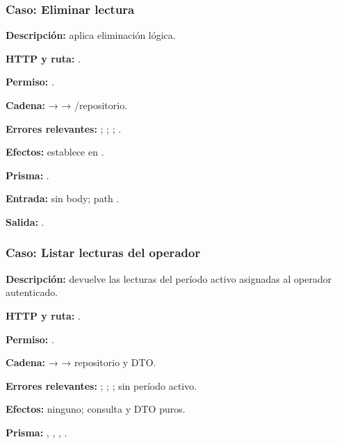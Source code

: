 \subsubsection{Caso: Eliminar lectura}


\textbf{Descripción:} aplica eliminación lógica.  

\textbf{HTTP y ruta:} \texttt{}.  

\textbf{Permiso:} \texttt{}.  

\textbf{Cadena:} \texttt{} → \texttt{} → \texttt{}/repositorio.  

\textbf{Errores relevantes:} \texttt{}; \texttt{}; \texttt{}; \texttt{}.  

\textbf{Efectos:} establece \texttt{} en \texttt{}.  

\textbf{Prisma:} \texttt{}.  

\textbf{Entrada:} sin body; path \texttt{}.  

\textbf{Salida:} \texttt{}.


\subsubsection{Caso: Listar lecturas del operador}


\textbf{Descripción:} devuelve las lecturas del período activo asignadas al operador autenticado.  

\textbf{HTTP y ruta:} \texttt{}.  

\textbf{Permiso:} \texttt{}.  

\textbf{Cadena:} \texttt{} → \texttt{} → repositorio y DTO.  

\textbf{Errores relevantes:} \texttt{}; \texttt{}; \texttt{}; \texttt{} sin período activo.  

\textbf{Efectos:} ninguno; consulta y DTO puros.  

\textbf{Prisma:} \texttt{}, \texttt{}, \texttt{}, \texttt{}.  

